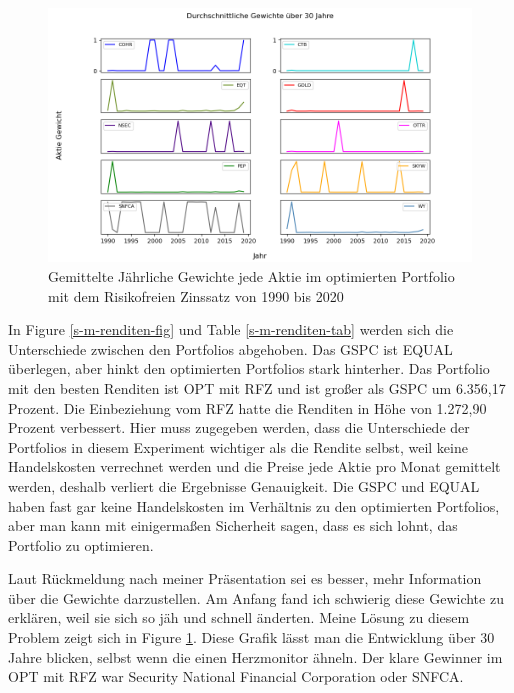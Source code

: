 \documentclass[12pt]{article}
\begin{document}
            \begin{figure}[ht]
            
                \begin{center}

                    \includegraphics[scale=0.65]{plot_allocations_30_years.png}
                    \caption{Gemittelte Jährliche Gewichte jede Aktie im optimierten Portfolio mit dem Risikofreien Zinssatz von 1990 bis 2020}
                    \label{g-jg-Aktie}
        
                \end{center}
                
            \end{figure}

            In Figure \ref{s-m-renditen-fig} und Table \ref{s-m-renditen-tab} werden sich die Unterschiede zwischen den Portfolios abgehoben. 
            Das GSPC ist EQUAL überlegen, aber hinkt den optimierten Portfolios stark hinterher. 
            Das Portfolio mit den besten Renditen ist OPT mit RFZ und ist großer als GSPC um 6.356,17 Prozent. 
            Die Einbeziehung vom RFZ hatte die Renditen in Höhe von 1.272,90 Prozent verbessert. 
            Hier muss zugegeben werden, dass die Unterschiede der Portfolios in diesem Experiment wichtiger als die Rendite selbst, 
            weil keine Handelskosten verrechnet werden und die Preise jede Aktie pro Monat gemittelt werden, 
            deshalb verliert die Ergebnisse Genauigkeit. Die GSPC und 
            EQUAL haben fast gar keine Handelskosten im Verhältnis zu den optimierten Portfolios, 
            aber man kann mit einigermaßen Sicherheit sagen, dass es sich lohnt, das Portfolio zu optimieren. 

            Laut Rückmeldung nach meiner Präsentation sei es besser, mehr Information über die Gewichte darzustellen.
            Am Anfang fand ich schwierig diese Gewichte zu erklären, weil sie sich so jäh und schnell änderten.
            Meine Lösung zu diesem Problem zeigt sich in Figure \ref{g-jg-Aktie}. Diese Grafik lässt man die Entwicklung
            über 30 Jahre blicken, selbst wenn die einen Herzmonitor ähneln. Der klare Gewinner im OPT mit RFZ war
            Security National Financial Corporation oder SNFCA.
\end{document}
